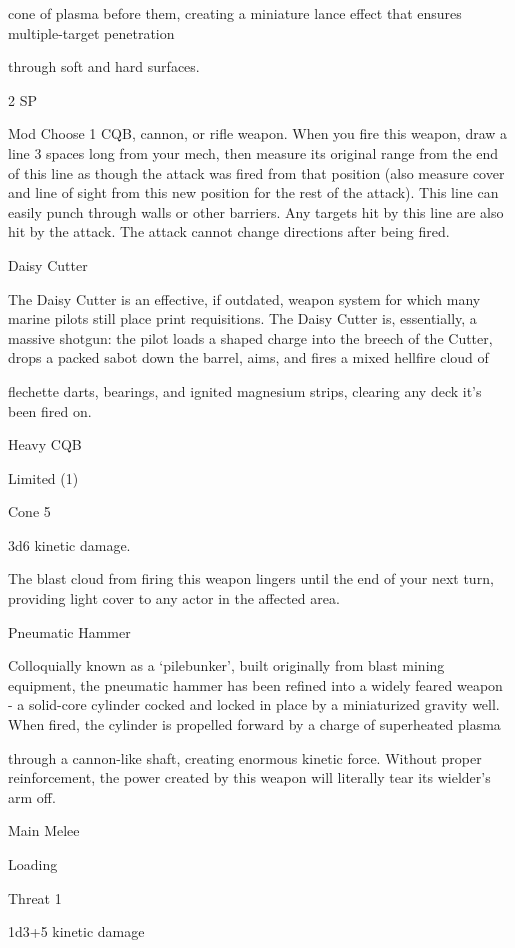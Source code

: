 cone of plasma before them, creating a miniature lance effect that ensures multiple-target penetration  

through soft and hard surfaces.    

2 SP  

Mod  
Choose 1 CQB, cannon, or rifle weapon. When you fire this weapon, draw a line 3 spaces long  
from your mech, then measure its original range from the end of this line as though the attack  
was fired from that position (also measure cover and line of sight from this new position for the  
rest of the attack). This line can easily punch through walls or other barriers. Any targets hit by  
this line are also hit by the attack. The attack cannot change directions after being fired.
 

Daisy Cutter  

The Daisy Cutter is an effective, if outdated, weapon system for which many marine pilots still place print  
requisitions. The Daisy Cutter is, essentially, a massive shotgun: the pilot loads a shaped charge into the  
breech of the Cutter, drops a packed sabot down the barrel, aims, and fires a mixed hellfire cloud of  

flechette darts, bearings, and ignited magnesium strips, clearing any deck it’s been fired on.   

Heavy CQB
 
Limited (1)
 
Cone 5
 
3d6 kinetic damage. 
 
The blast cloud from firing this weapon lingers until the end of your next turn, providing light  
cover to any actor in the affected area.
 

Pneumatic Hammer  

Colloquially known as a ‘pilebunker’, built originally from blast mining equipment, the pneumatic hammer  
has been refined into a widely feared weapon - a solid-core cylinder cocked and locked in place by a  
miniaturized gravity well. When fired, the cylinder is propelled forward by a charge of superheated plasma  

through a cannon-like shaft, creating enormous kinetic force. Without proper reinforcement, the power  
created by this weapon will literally tear its wielder’s arm off.  

Main Melee
 
Loading
 
Threat 1
 
1d3+5 kinetic damage
 

